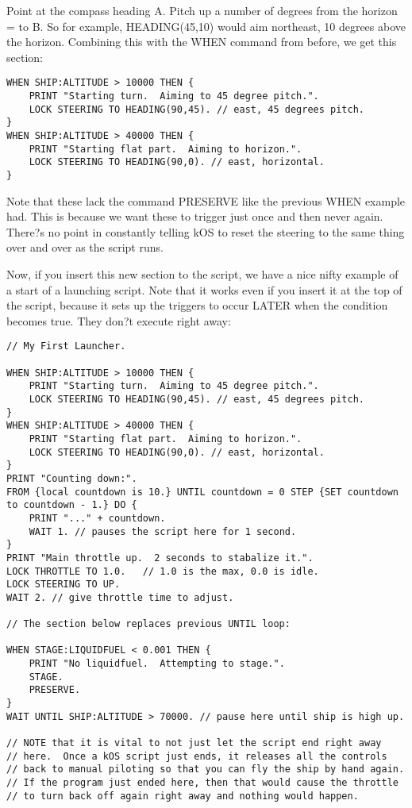 Point at the compass heading A.
Pitch up a number of degrees from the horizon = to B.
So for example, HEADING(45,10) would aim northeast, 10 degrees above the horizon. Combining this with the WHEN command from before, we get this section:

\begin{Verbatim}[frame=single]
WHEN SHIP:ALTITUDE > 10000 THEN {
    PRINT "Starting turn.  Aiming to 45 degree pitch.".
    LOCK STEERING TO HEADING(90,45). // east, 45 degrees pitch.
}
WHEN SHIP:ALTITUDE > 40000 THEN {
    PRINT "Starting flat part.  Aiming to horizon.".
    LOCK STEERING TO HEADING(90,0). // east, horizontal.
}
\end{Verbatim} 

Note that these lack the command PRESERVE like the previous WHEN example had. This is because we want these to trigger just once and then never again. There?s no point in constantly telling kOS to reset the steering to the same thing over and over as the script runs.

Now, if you insert this new section to the script, we have a nice nifty example of a start of a launching script. Note that it works even if you insert it at the top of the script, because it sets up the triggers to occur LATER when the condition becomes true. They don?t execute right away:

\begin{Verbatim}[frame=single]
// My First Launcher.

WHEN SHIP:ALTITUDE > 10000 THEN {
    PRINT "Starting turn.  Aiming to 45 degree pitch.".
    LOCK STEERING TO HEADING(90,45). // east, 45 degrees pitch.
}
WHEN SHIP:ALTITUDE > 40000 THEN {
    PRINT "Starting flat part.  Aiming to horizon.".
    LOCK STEERING TO HEADING(90,0). // east, horizontal.
}
PRINT "Counting down:".
FROM {local countdown is 10.} UNTIL countdown = 0 STEP {SET countdown to countdown - 1.} DO {
    PRINT "..." + countdown.
    WAIT 1. // pauses the script here for 1 second.
}
PRINT "Main throttle up.  2 seconds to stabalize it.".
LOCK THROTTLE TO 1.0.   // 1.0 is the max, 0.0 is idle.
LOCK STEERING TO UP.
WAIT 2. // give throttle time to adjust.

// The section below replaces previous UNTIL loop:

WHEN STAGE:LIQUIDFUEL < 0.001 THEN {
    PRINT "No liquidfuel.  Attempting to stage.".
    STAGE.
    PRESERVE.
}
WAIT UNTIL SHIP:ALTITUDE > 70000. // pause here until ship is high up.

// NOTE that it is vital to not just let the script end right away
// here.  Once a kOS script just ends, it releases all the controls
// back to manual piloting so that you can fly the ship by hand again.
// If the program just ended here, then that would cause the throttle
// to turn back off again right away and nothing would happen.
\end{Verbatim} 

